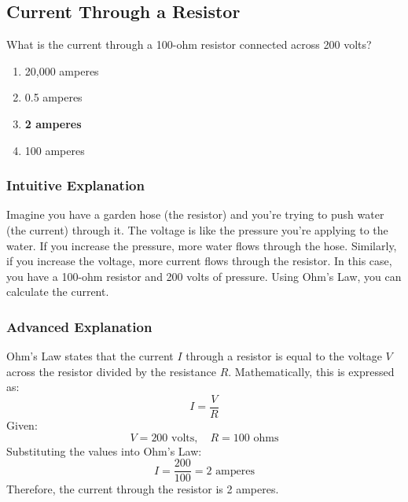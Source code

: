 \subsection{Current Through a Resistor}
\label{T5D08}

\begin{tcolorbox}[colback=gray!10!white,colframe=black!75!black,title=T5D08]
What is the current through a 100-ohm resistor connected across 200 volts?
\begin{enumerate}[noitemsep]
    \item 20,000 amperes
    \item 0.5 amperes
    \item \textbf{2 amperes}
    \item 100 amperes
\end{enumerate}
\end{tcolorbox}

\subsubsection*{Intuitive Explanation}
Imagine you have a garden hose (the resistor) and you're trying to push water (the current) through it. The voltage is like the pressure you're applying to the water. If you increase the pressure, more water flows through the hose. Similarly, if you increase the voltage, more current flows through the resistor. In this case, you have a 100-ohm resistor and 200 volts of pressure. Using Ohm's Law, you can calculate the current.

\subsubsection*{Advanced Explanation}
Ohm's Law states that the current \( I \) through a resistor is equal to the voltage \( V \) across the resistor divided by the resistance \( R \). Mathematically, this is expressed as:
\[
I = \frac{V}{R}
\]
Given:
\[
V = 200 \text{ volts}, \quad R = 100 \text{ ohms}
\]
Substituting the values into Ohm's Law:
\[
I = \frac{200}{100} = 2 \text{ amperes}
\]
Therefore, the current through the resistor is 2 amperes.

